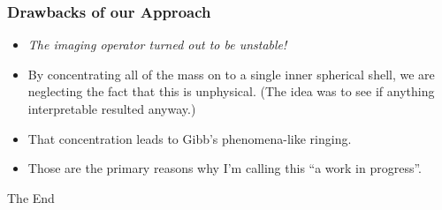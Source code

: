 \documentclass[aspectratio=43,mathserif]{beamer}
\begin{document}
\begin{frame}
\frametitle{Drawbacks of our Approach}

\begin{itemize}

\item \emph{The imaging operator turned out to be unstable!}
\item By concentrating all of the mass on to a single inner spherical shell, we are neglecting the fact that this is unphysical. (The idea was to see if anything interpretable resulted anyway.)

\item That concentration leads to Gibb's phenomena-like ringing.

\item Those are the primary reasons why I'm calling this ``a work in progress''.

\end{itemize}
\end{frame}



\begin{frame}
\Huge{\centerline{The End}}
\end{frame}

\end{document}
